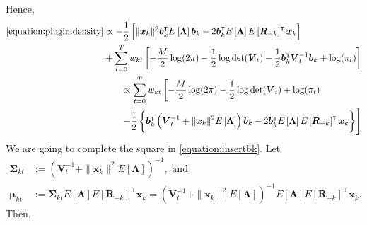\documentclass[11pt,authoryear]{article}
\newcommand{\bs}[1]{\boldsymbol{#1}}
\begin{document}
Hence,
\begin{align}
  \begin{split}
    \eqref{equation:plugin.density} &\propto -\frac{1}{2}\left[\|\bs{x}_k\|^2\bs{b}_k^{\intercal}E\left[\bs{\Lambda}\right]\bs{b}_k - 2\bs{b}_k^{\intercal}E\left[\bs{\Lambda}\right]E\left[\bs{R}_{-k}\right]^{\intercal}\bs{x}_k\right]\\
    &+\sum_{t = 0}^Tw_{kt}\left[-\frac{M}{2}\log(2\pi) - \frac{1}{2}\log\det(\bs{V}_t) - \frac{1}{2}\bs{b}_k^{\intercal}\bs{V}_t^{-1}\bs{b}_k + \log(\pi_t)\right]
  \end{split}\\
  \begin{split}
    \label{equation:insertbk}
    &\propto \sum_{t = 0}^Tw_{kt}\left[-\frac{M}{2}\log(2\pi) - \frac{1}{2}\log\det(\bs{V}_t) +  \log(\pi_t) \right.\\
    &\left. - \frac{1}{2}\left\{\bs{b}_k^{\intercal}\left(\bs{V}_t^{-1} + \|\bs{x}_k\|^2E\left[\bs{\Lambda}\right]\right)\bs{b}_k - 2\bs{b}_k^{\intercal}E\left[\bs{\Lambda}\right]E\left[\bs{R}_{-k}\right]^{\intercal}\bs{x}_k \right\} \right]
  \end{split}
\end{align}
We are going to complete the square in \eqref{equation:insertbk}. Let
\begin{align}
  \bs{\Sigma}_{kt} &:= \left(\bs{V}_t^{-1} + \|\bs{x}_k\|^2E\left[\bs{\Lambda}\right]\right)^{-1}, \text{ and}\\
  \bs{\mu}_{kt} &:= \bs{\Sigma}_{kt}E\left[\bs{\Lambda}\right]E\left[\bs{R}_{-k}\right]^{\intercal}\bs{x}_k = \left(\bs{V}_t^{-1} + \|\bs{x}_k\|^2E\left[\bs{\Lambda}\right]\right)^{-1}E\left[\bs{\Lambda}\right]E\left[\bs{R}_{-k}\right]^{\intercal}\bs{x}_k.
\end{align}
Then,
\end{document}
